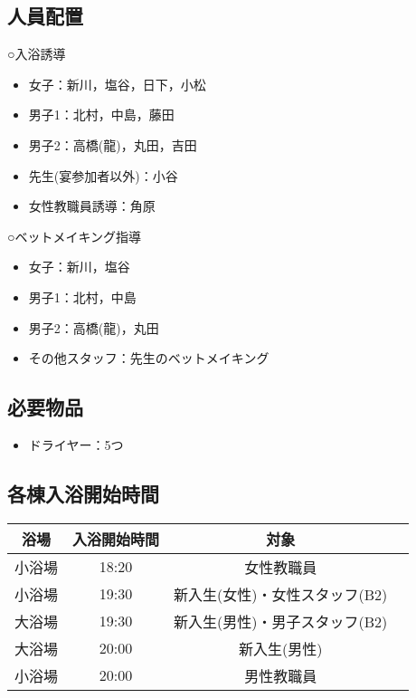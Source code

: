 \subsection{人員配置}
○入浴誘導
\begin{itemize}
 \item 女子：新川，塩谷，日下，小松
 \item 男子1：北村，中島，藤田
 \item 男子2：高橋(龍)，丸田，吉田
 \item 先生(宴参加者以外)：小谷
 \item 女性教職員誘導：角原
\end{itemize}

\newpage

○ベットメイキング指導
\begin{itemize}
\item 女子：新川，塩谷
\item 男子1：北村，中島
\item 男子2：高橋(龍)，丸田
\item その他スタッフ：先生のベットメイキング
\end{itemize}
\subsection{必要物品}
\begin{itemize}
\item ドライヤー：5つ
\end{itemize}

\subsection{各棟入浴開始時間}
\label{sec:bath}
\begin{table}[h]
\begin{tabular}{|c|c|c|l|}
\hline
{浴場}&{入浴開始時間}&\multicolumn{1}{c|}{対象} \\ \hline\hline
 小浴場 & 18:20 & 女性教職員 \\ \hline
 小浴場 & 19:30 & 新入生(女性)・女性スタッフ(B2)\\ \hline
 大浴場 & 19:30 & 新入生(男性)・男子スタッフ(B2) \\ \hline 
 大浴場 & 20:00 & 新入生(男性)\\ \hline
 小浴場 & 20:00 & 男性教職員 \\ \hline
\end{tabular}
\end{table}
